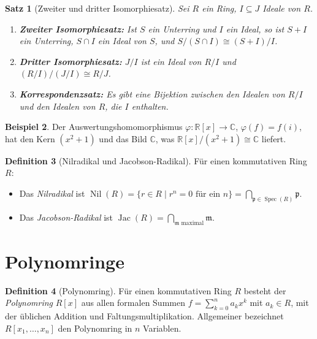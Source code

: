 \documentclass[12pt,a4paper]{amsart}
\newtheorem{theorem}{Satz}[section]
\theoremstyle{definition}
\newtheorem{definition}[theorem]{Definition}
\newtheorem{example}[theorem]{Beispiel}
\theoremstyle{definition}
\DeclareMathOperator{\Spec}{Spec}
\DeclareMathOperator{\Nil}{Nil}
\DeclareMathOperator{\Jac}{Jac}
\begin{document}
\begin{theorem}[Zweiter und dritter Isomorphiesatz]
Sei $R$ ein Ring, $I \subseteq J$ Ideale von $R$.
\begin{enumerate}[label=(\roman*)]
  \item \textbf{Zweiter Isomorphiesatz:} Ist $S$ ein Unterring und $I$ ein Ideal,
        so ist $S + I$ ein Unterring, $S \cap I$ ein Ideal von $S$, und
        $S/(S \cap I) \cong (S+I)/I$.
  \item \textbf{Dritter Isomorphiesatz:} $J/I$ ist ein Ideal von $R/I$ und
        $(R/I)/(J/I) \cong R/J$.
  \item \textbf{Korrespondenzsatz:} Es gibt eine Bijektion zwischen den Idealen
        von $R/I$ und den Idealen von $R$, die $I$ enthalten.
\end{enumerate}
\end{theorem}

\begin{example}
Der Auswertungshomomorphismus $\varphi\colon \mathbb{R}[x] \to \mathbb{C}$,
$\varphi(f) = f(i)$, hat den Kern $(x^2 + 1)$ und das Bild $\mathbb{C}$, was
$\mathbb{R}[x]/(x^2+1) \cong \mathbb{C}$ liefert.
\end{example}

\begin{definition}[Nilradikal und Jacobson-Radikal]
Für einen kommutativen Ring $R$:
\begin{itemize}
  \item Das \emph{Nilradikal} ist $\Nil(R) = \{r \in R \mid r^n = 0 \text{ für ein } n\} = \bigcap_{\mathfrak{p} \in \Spec(R)} \mathfrak{p}$.
  \item Das \emph{Jacobson-Radikal} ist $\Jac(R) = \bigcap_{\mathfrak{m} \text{ maximal}} \mathfrak{m}$.
\end{itemize}
\end{definition}

\section{Polynomringe}

\begin{definition}[Polynomring]
Für einen kommutativen Ring $R$ besteht der \emph{Polynomring} $R[x]$ aus allen
formalen Summen $f = \sum_{k=0}^n a_k x^k$ mit $a_k \in R$, mit der üblichen
Addition und Faltungsmultiplikation. Allgemeiner bezeichnet $R[x_1,\ldots,x_n]$
den Polynomring in $n$ Variablen.
\end{definition}
\end{document}
